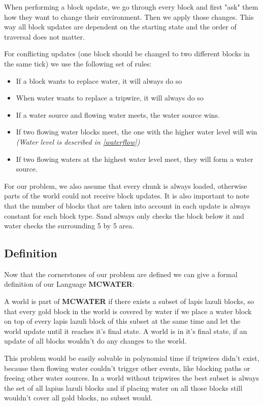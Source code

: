 \noindent When performing a block update, we go through every block and first "ask" them how they want to change their environment. Then we apply those changes. This way all block updates are dependent on the starting state and the order of traversal does not matter.

\noindent For conflicting updates (one block should be changed to two different blocks in the same tick) we use the following set of rules:

\begin{itemize}
    \item If a block wants to replace water, it will always do so
    \item When water wants to replace a tripwire, it will always do so
    \item If a water source and flowing water meets, the water source wins.
    \item If two flowing water blocks meet, the one with the higher water level will win \textit{(Water level is described in \ref{waterflow})}
    \item If two flowing waters at the highest water level meet, they will form a water source.
\end{itemize}

\noindent For our problem, we also assume that every chunk is always loaded, otherwise parts of the world could not receive block updates. It is also important to note that the number of blocks that are taken into account in each update is always constant for each block type. Sand always only checks the block below it and water checks the surrounding 5 by 5 area.

\subsection{Definition}

Now that the cornerstones of our problem are defined we can give a formal definition of our Language \textbf{MCWATER}:

\noindent A world is part of \textbf{MCWATER} if there exists a subset of lapis lazuli blocks, so that every gold block in the world is covered by water if we place a water block on top of every lapis lazuli block of this subset at the same time and let the world update until it reaches it's final state. A world is in it's final state, if an update of all blocks wouldn't do any changes to the world.

\noindent This problem would be easily solvable in polynomial time if tripwires didn't exist, because then flowing water couldn't trigger other events, like blocking paths or freeing other water sources. In a world without tripwires the best subset is always the set of all lapius lazuli blocks and if placing water on all those blocks still wouldn't cover all gold blocks, no subset would.
